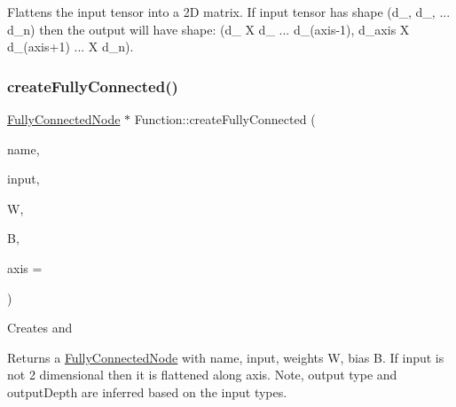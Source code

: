 Flattens the input tensor into a 2D matrix. If input tensor has shape (d\+\_, d\+\_, ... d\+\_\+n) then the output will have shape\+: (d\+\_ X d\+\_ ... d\+\_\+(axis-\/1), d\+\_\+axis X d\+\_\+(axis+1) ... X d\+\_\+n). \mbox{\label{classglow_1_1_function_a369fe971f7e75ca38ff5d6bb0928be89}} 
\subsubsection{\texorpdfstring{create\+Fully\+Connected()}{createFullyConnected()}\hspace{0.1cm}{\footnotesize\ttfamily [1/3]}}
{\footnotesize\ttfamily \hyperlink{classglow_1_1_fully_connected_node}{Fully\+Connected\+Node} $\ast$ Function\+::create\+Fully\+Connected (\begin{DoxyParamCaption}\item[{llvm\+::\+String\+Ref}]{name,  }\item[{\hyperlink{structglow_1_1_node_value}{Node\+Value}}]{input,  }\item[{\hyperlink{classglow_1_1_storage}{Storage} $\ast$}]{W,  }\item[{\hyperlink{classglow_1_1_storage}{Storage} $\ast$}]{B,  }\item[{\hyperlink{namespaceglow_a0ca574644e1e42ef193a9947fb4d8911}{unsigned\+\_\+t}}]{axis = {} }\end{DoxyParamCaption})}

Creates and \begin{DoxyReturn}{Returns}
a \hyperlink{classglow_1_1_fully_connected_node}{Fully\+Connected\+Node} with {\ttfamily name}, {\ttfamily input}, weights {\ttfamily W}, bias {\ttfamily B}. If {\ttfamily input} is not 2 dimensional then it is flattened along {\ttfamily axis}. Note, output type and output\+Depth are inferred based on the input types. 
\end{DoxyReturn}
\mbox{\label{classglow_1_1_function_ad38b3e6dd3052c286126ab1239d97aa8}} 
